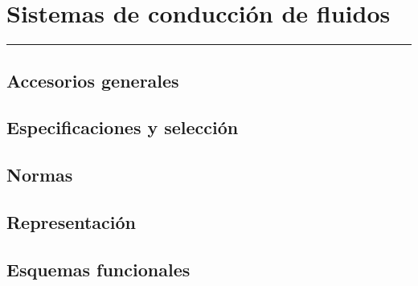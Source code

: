 \chapter{Sistemas de conducción de fluidos}

\vspace{\fill}

\hrule

\vspace{.3cm}

{\large \lipsum[1]} 

\pagestyle{fancy}

\newpage


	\section{Accesorios generales}
	\Biblio{}

	\section{Especificaciones y selección}
	\Biblio{}

	\section{Normas}
	\Biblio{}

	\section{Representación}
	\Biblio{}

	\section{Esquemas funcionales}
	\Biblio{}


\newpage
\pagestyle{empty}